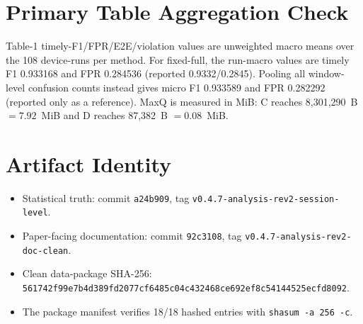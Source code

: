 \documentclass[10pt]{article}
\begin{document}
\section{Primary Table Aggregation Check}
Table-1 timely-F1/FPR/E2E/violation values are unweighted macro means over the 108 device-runs per method. For fixed-full, the run-macro values are timely F1 0.933168 and FPR 0.284536 (reported 0.9332/0.2845). Pooling all window-level confusion counts instead gives micro F1 0.933589 and FPR 0.282292 (reported only as a reference). MaxQ is measured in MiB: C reaches 8,301,290~B $=7.92$~MiB and D reaches 87,382~B $=0.08$~MiB.

\section{Artifact Identity}
\begin{itemize}
\item Statistical truth: commit \texttt{a24b909}, tag \texttt{v0.4.7-analysis-rev2-session-level}.
\item Paper-facing documentation: commit \texttt{92c3108}, tag \texttt{v0.4.7-analysis-rev2-doc-clean}.
\item Clean data-package SHA-256: \texttt{561742f99e7b4d389fd2077cf6485c04c432468ce692ef8c54144525ecfd8092}.
\item The package manifest verifies 18/18 hashed entries with \texttt{shasum -a 256 -c}.
\end{itemize}
\end{document}
